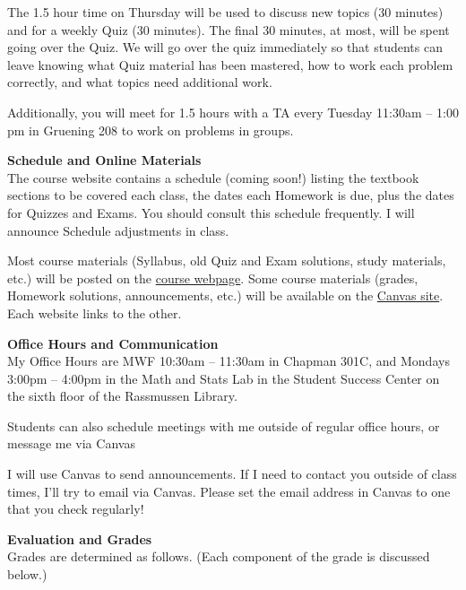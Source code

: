 \documentclass[12pt]{article}
\renewcommand{\emph}[1]{\textsf{\textbf{#1}}}
\newcommand{\localhead}[1]{\par\smallskip\textbf{#1} \smallskip\nobreak\\}%
\def\heading#1{\localhead{\large\emph{#1}}}
\begin{document}
The 1.5 hour time on Thursday will be used to discuss new topics (30 minutes) and for a weekly Quiz (30 minutes).  The final 30 minutes, at most, will be spent going over the Quiz.  We will go over the quiz immediately so that students can leave knowing what Quiz material has been mastered, how to work each problem correctly, and what topics need additional work.

Additionally, you will meet for 1.5 hours with a TA every Tuesday
11:30am -- 1:00 pm in Gruening 208 to work on problems in groups.

\clearpage\newpage

\strut

\vspace{-12pt}

\heading{Schedule and Online Materials}
The course website contains a
schedule (coming soon!)
listing the textbook sections to be covered each class, the dates each
Homework is due, plus the dates for Quizzes and Exams. You should
consult this schedule frequently.  I will announce Schedule
adjustments in class.

Most course materials (Syllabus, old Quiz and Exam solutions, study materials, etc.) will be posted on the \href{https://uaf-math251.github.io/calc2/}{course webpage}.  Some course materials (grades, Homework solutions, announcements, etc.) will be available on the \href{https://canvas.alaska.edu/courses/21592}{Canvas site}.  Each website links to the other.


\heading{Office Hours and Communication}
My Office Hours are MWF 10:30am -- 11:30am in Chapman 301C, and
Mondays 3:00pm -- 4:00pm in the Math and Stats Lab in the Student
Success Center on the sixth floor of the Rassmussen Library.

Students can also schedule meetings with me outside of regular office
hours, or message me via Canvas


I will use Canvas to send announcements.  If I need to contact you outside of class times, I'll try to email via Canvas.  Please set the email address in Canvas to one that you check regularly!


\heading{Evaluation and Grades}
Grades are determined as follows.  (Each component of the grade is discussed below.)
 
\end{document}
